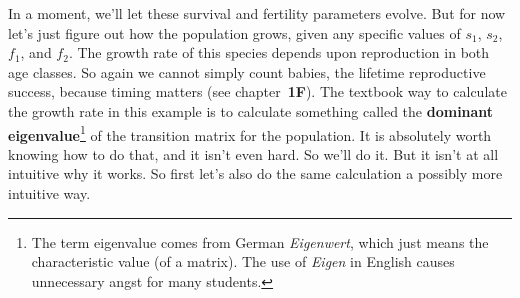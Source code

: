 \documentclass[10pt,reqno]{amsbook}
\newcommand{\bemph}[1]{{\textbf{\textcolor{bemphcol}{#1}}}}
\numberwithin{equation}{chapter}
\begin{document}
In a moment, we'll let these survival and fertility parameters evolve. But for now let's just figure out how the population grows, given any specific values of $s_1$, $s_2$, $f_1$, and $f_2$. 
The growth rate of this species depends upon reproduction in both age classes. So again we cannot simply count babies, the lifetime reproductive success, because timing matters (see chapter~\bemph{1F}). The textbook way to calculate the growth rate in this example is to calculate something called the \bemph{dominant eigenvalue}\footnote{The term eigenvalue comes from German \emph{Eigenwert}, which just means the characteristic value (of a matrix). The use of \emph{Eigen} in English causes unnecessary angst for many students.} of the transition matrix for the population. It is absolutely worth knowing how to do that, and it isn't even hard. So we'll do it. But it isn't at all intuitive why it works. So first let's also do the same calculation a possibly more intuitive way.
\end{document}
